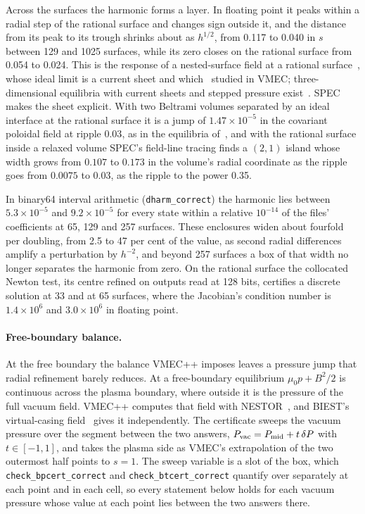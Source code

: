\documentclass[11pt]{article}
\newcommand{\code}[1]{\texttt{#1}}
\begin{document}
Across the surfaces the harmonic forms a layer. In floating point it peaks
within a radial step of the rational surface and changes sign outside it, and
the distance from its peak to its trough shrinks about as $h^{1/2}$, from 0.117
to 0.040 in $s$ between 129 and 1025 surfaces, while its zero closes on the
rational surface from 0.054 to 0.024. This is the response of a nested-surface field at a
rational surface~\cite{grad1967,hahm1985,loizu2015b}, whose ideal limit is a
current sheet and which~\cite{lazerson2016} studied in VMEC; three-dimensional
equilibria with current sheets and stepped pressure
exist~\cite{bruno1996,enciso2025}. SPEC~\cite{hudson2012} makes the sheet
explicit. With two Beltrami volumes separated by an ideal interface at the
rational surface it is a jump of $1.47\times10^{-5}$ in the covariant poloidal
field at ripple $0.03$, as in the equilibria of~\cite{loizu2015}, and with the
rational surface inside a relaxed volume SPEC's field-line tracing finds a
$(2,1)$ island whose width grows from $0.107$ to $0.173$ in the volume's radial
coordinate as the ripple goes from $0.0075$ to $0.03$, as the ripple to the
power 0.35.

In binary64 interval arithmetic (\code{dharm\_correct}) the harmonic lies
between $5.3\times10^{-5}$ and $9.2\times10^{-5}$ for every state within a
relative $10^{-14}$ of the files' coefficients at 65, 129 and 257 surfaces.
These enclosures widen about fourfold per doubling, from 2.5 to 47 per cent of
the value, as second radial differences amplify a perturbation by $h^{-2}$, and
beyond 257 surfaces a box of that width no longer separates the harmonic from
zero. On the rational surface the
collocated Newton test, its centre refined on outputs read at 128 bits,
certifies a discrete solution at 33 and at 65 surfaces, where the Jacobian's
condition number is $1.4\times10^6$ and $3.0\times10^6$ in floating point.

\paragraph{Free-boundary balance.}
At the free boundary the balance VMEC++ imposes leaves a pressure jump that
radial refinement barely reduces. At a free-boundary equilibrium
$\mu_0p+B^2/2$ is continuous across the plasma boundary, where outside it is the
pressure of the full vacuum field. VMEC++ computes that field with
NESTOR~\cite{merkel1986,hirshman1986}, and BIEST's virtual-casing
field~\cite{malhotra2019,malhotra2020} gives it independently. The certificate
sweeps the vacuum pressure over the segment between the two answers,
$P_{\rm vac}=P_{\rm mid}+t\,\delta P$ with $t\in[-1,1]$, and takes the plasma
side as VMEC's extrapolation of the two outermost half points to $s=1$. The
sweep variable is a slot of the box, which \code{check\_bpcert\_correct} and
\code{check\_btcert\_correct} quantify over separately at each point and in each
cell, so every statement below holds for each vacuum pressure whose value at
each point lies between the two answers there.
\end{document}

